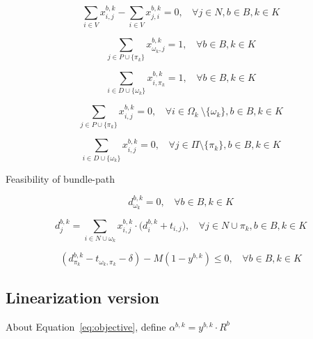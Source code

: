 \documentclass[12pt ]{article}
\begin{document}
\begin{equation}
	\sum_{i \in V} x_{i,j}^{b,k} - \sum_{i \in V} x_{j,i}^{b,k} = 0,~~~~\forall j \in N, b \in B, k \in K
	\label{eq:consecutive}
\end{equation}

\begin{equation}
	\sum_{j \in P \cup \{\pi_k\}} x_{\omega_k,j}^{b,k} = 1,~~~~\forall b \in B, k \in K
	\label{eq:beginTau1}
\end{equation}

\begin{equation}
	\sum_{i \in D \cup \{\omega_k\}} x_{i,\pi_k}^{b,k} = 1,~~~~\forall b \in B, k \in K
	\label{eq:endTau1}
\end{equation}

\begin{equation}
	\sum_{j \in P \cup \{\pi_k\}} x_{i,j}^{b,k} = 0,~~~~\forall i \in \Omega_k\ \setminus \{ \omega_k \}, b \in B, k \in K
	\label{eq:beginTau2}
\end{equation}

\begin{equation}
	\sum_{i \in D \cup \{\omega_k\}} x_{i,j}^{b,k} = 0,~~~~\forall j \in \Pi \setminus \{\pi_k\}, b \in B, k \in K
	\label{eq:endTau2}
\end{equation}


Feasibility of bundle-path

\begin{equation}
	d_{\omega_k}^{b,k} = 0,~~~~\forall b \in B, k \in K
	\label{eq:computeDistance1}
\end{equation}

\begin{equation}
	d_j^{b,k} = \sum_{i \in N \cup \omega_k} x_{i,j}^{b,k} \cdot \big( d_i^{b,k} + t_{i,j} \big),~~~~\forall j \in N \cup \pi_k, b \in B, k \in K
	\label{eq:computeDistanceNonLinear2}
\end{equation}

\begin{equation} 
	(d_{\pi_k}^{b, k} - t_{\omega_k, \pi_k} - \delta) - M (1 - y^{b, k}) \le 0,~~~~\forall b \in B, k \in K
\label{eq:feasibility}
\end{equation}


\subsection{Linearization version}

About Equation~\ref{eq:objective}, define $\alpha^{b,k} = y^{b,k} \cdot R^b$
\end{document}
